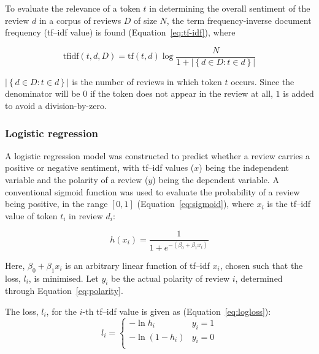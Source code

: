 \documentclass[12pt, a4paper]{pancake-article}
\begin{document}
To evaluate the relevance of a token \(t\) in determining the overall sentiment of the
review \(d\) in a corpus of reviews \(D\) of size \(N\), the term frequency-inverse document frequency
(tf--idf value) is found (Equation~\ref{eq:tf-idf}), where

\begin{equation}
	\text{tfidf}\left(t, d, D\right) = \text{tf}\left(t, d\right)\log\frac{N}{1 + \left|\left\{d \in D : t\in d\right\}\right|}
	\label{eq:tf-idf}
\end{equation}

\(\left|\left\{d \in D : t \in d\right\}\right|\) is the number of reviews in which token \(t\) occurs.
Since the denominator will be \(0\) if the token does not appear in the review at all, \(1\) is added
to avoid a division-by-zero.

\subsubsection{Logistic regression}

A logistic regression model was constructed to predict whether a review carries a positive or negative sentiment,
with tf--idf values ($x$) being the independent variable and the polarity of a review ($y$) being the
dependent variable.
A conventional sigmoid function was used to evaluate the probability of a review being positive, in the range
\(\left[0, 1\right]\) (Equation~\ref{eq:sigmoid}), where \(x_i\) is the tf--idf value of token \(t_i\) in
review \(d_i\):

\begin{equation}
	h\left(x_i\right)	= \frac{1}{1 + e^{-\left(\beta_0 + \beta_1 x_i\right)}}
	\label{eq:sigmoid}
\end{equation}

Here, \(\beta_0 + \beta_1 x_i\) is an arbitrary linear function of tf--idf \(x_i\), chosen
such that the loss, \(l_i\), is minimised. Let \(y_i\) be the actual polarity of review \(i\),
determined through Equation~\ref{eq:polarity}.

The loss, \(l_i\), for the \(i\)-th tf--idf value is given as (Equation~\ref{eq:logloss}):
\begin{equation}
	l_i = \begin{cases}
		- \ln h_i                  & y_i = 1 \\
		- \ln \left(1 - h_i\right) & y_i = 0 \\
	\end{cases}
	\label{eq:logloss}
\end{equation}
\end{document}
